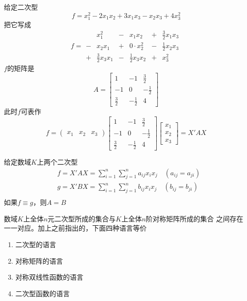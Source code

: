 \documentclass[11pt]{article}
\begin{document}
\begin{examplle}[]
给定二次型
\begin{equation*}
f=x_1^2-2x_1x_2+3x_1x_3-x_2x_3+4x_3^2
\end{equation*}
把它写成
\begin{equation*}
f=
\begin{array}{cccccc}
&x_1^2&-&x_1x_2&+&\frac{3}{2}x_1x_3\\
-&x_2x_1&+&0\cdot x_2^2&-&\frac{1}{2}x_2x_3\\
+&\frac{3}{2}x_3x_1&-&\frac{1}{2}x_3x_2&+&x_3^2
\end{array}
\end{equation*}
\(f\)的矩阵是
\begin{equation*}
A=
\begin{bmatrix}
1&-1&\frac{3}{2}\\
-1&0&-\frac{1}{2}\\
\frac{3}{2}&-\frac{1}{2}&4
\end{bmatrix}
\end{equation*}
此时\(f\)可表作
\begin{equation*}
f=
\begin{pmatrix}
x_1&x_2&x_3
\end{pmatrix}
   \begin{bmatrix}
1&-1&\frac{3}{2}\\
-1&0&-\frac{1}{2}\\
\frac{3}{2}&-\frac{1}{2}&4
\end{bmatrix}
\begin{bmatrix}
x_1\\x_2\\x_3
\end{bmatrix}=X'AX
\end{equation*}
\end{examplle}

\begin{proposition}[]
给定数域\(K\)上两个二次型
\begin{align*}
&f=X'AX=\sum_{i=1}^n\sum_{j=1}^na_{ij}x_ix_j\quad(a_{ij}=a_{ji})\\
&g=X'BX=\sum_{i=1}^n\sum_{j=1}^nb_{ij}x_ix_j\quad(b_{ij}=b_{ji})\\
\end{align*}
如果\(f\equiv g\)，则\(A=B\)
\end{proposition}

数域\(K\)上全体\(n\)元二次型所成的集合与\(K\)上全体\(n\)阶对称矩阵所成的集合
之间存在一一对应。加上之前指出的，下面四种语言等价
\begin{enumerate}
\item 二次型的语言
\item 对称矩阵的语言
\item 对称双线性函数的语言
\item 二次型函数的语言
\end{enumerate}
\end{document}
